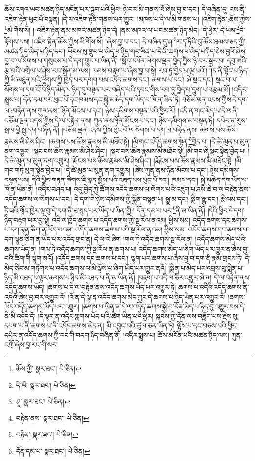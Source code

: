 ཆོས་འགའ་ཡང་མཚན་ཉིད་མངོན་པར་སྒྲུབ་པའི་ཕྱིར། ཉེ་བར་མི་གནས་སོ་ཞེས་བྱ་བ་དང་། དེ་བཞིན་དུ། ངས་ནི་འཇིག་རྟེན་ཕུང་པོ་བསྟན། །དེ་ལ་འཇིག་རྟེན་གནས་པར་གྱུར། །མཁས་པ་དེ་ལ་མི་གནས་པ། །འཇིག་རྟེན་:ཆོས་ཀྱིས་\footnote{ཆོས་ཀྱི་  སྣར་ཐང་།  པེ་ཅིན། }མི་གོས་སོ། །
འཇིག་རྟེན་ནམ་མཁའི་མཚན་ཉིད་དེ། །ནམ་མཁའ་ལ་ཡང་མཚན་ཉིད་མེད། །དེ་ཕྱིར་:དེ་ཡིས་\footnote{དེ་ཡི་  སྣར་ཐང་།  པེ་ཅིན། }དེ་རྟོགས་པས། །འཇིག་རྟེན་ཆོས་ཀྱིས་མི་གོས་སོ། །ཞེས་བྱ་བ་དང་། དེ་བཞིན་དུ་ཤ་\footnote{ཤཱ་  སྣར་ཐང་།  པེ་ཅིན། }ར་དྭ་ཏིའི་བུ་ཆོས་ཐམས་ཅད་ཀྱི་མཚན་ཉིད་མེད་པ་ཉིད་དང་། ཡོངས་སུ་གྲུབ་པ་མེད་པ་ཉིད་གང་ཡིན་པ་དེ་ནི་ཆགས་པ་མེད་པ་ཉིད་ཅེས་བྱའོ་ཞེས་བྱ་བ་ལ་སོགས་པ་གསུངས་པ་དེ་དག་གྲུབ་པ་ཡིན་ནོ། །སློབ་དཔོན་ལེགས་ལྡན་བྱེད་ཀྱིས་ཉེ་བར་སྦྱར་བ། དབུ་མའི་རྩ་བའི་འགྲེལ་པ་ཤེས་རབ་སྒྲོན་མ་ལས། ཁམས་བརྟག་པ་ཞེས་བྱ་བ་སྟེ། རབ་ཏུ་བྱེད་པ་ལྔ་པའོ།། །།ད་ནི་སྟོང་པ་ཉིད་ཀྱི་མི་མཐུན་པའི་ཕྱོགས་ཀྱི་ཁྱད་པར་དགག་པས་འདོད་ཆགས་དང་། ཆགས་པ་དང་། ཞེ་སྡང་དང་། སྡང་བ་ལ་སོགས་པ་དག་ངོ་བོ་ཉིད་མེད་པ་ཉིད་དུ་བསྟན་པར་བཞེད་པའི་དབང་གིས་རབ་ཏུ་བྱེད་པ་དྲུག་པ་བརྩམ་མོ། །འདིར་སྨྲས་པ། དོན་དམ་པར་ཕུང་པོ་དང་ཁམས་དང་སྐྱེ་མཆེད་དག་ཡོད་པ་ཁོ་ན་ཡིན་ཏེ། བཅོམ་ལྡན་འདས་ཀྱིས་དེ་དག་ལ་:བརྟེན་ནས་ཀུན་ནས་\footnote{བརྟེན་ནས་  སྣར་ཐང་།  པེ་ཅིན། }ཉོན་མོངས་པ་དང་། ཉེས་དམིགས་བསྟན་པའི་ཕྱིར་རོ། །འདི་ན་གང་མེད་པ་དེ་ལ་ནི་བཅོམ་ལྡན་འདས་ཀྱིས་དེ་ལ་བརྟེན་ནས། ཀུན་ནས་ཉོན་མོངས་པ་དང་། ཉེས་དམིགས་མ་བསྟན་ཏེ། དཔེར་ན་རུས་སྦལ་གྱི་སྤུ་དག་བཞིན་ནོ། །བཅོམ་ལྡན་འདས་ཀྱིས་ཕུང་པོ་ལ་སོགས་པ་དག་ལ་བརྟེན་ནས། ཆགས་པས་ཆོས་རྣམས་མི་ཤེས་ཤིང་། །ཆགས་པས་ཆོས་རྣམས་མི་མཐོང་སྟེ། །མི་གང་འདོད་ཆགས་སྟེན་\footnote{བརྟེན་  སྣར་ཐང་།  པེ་ཅིན། }བྱེད་པ། །དེ་ཚེ་མུན་པ་མུན་ནག་འགྱུར། །སྡང་བས་ཆོས་རྣམས་མི་ཤེས་ཤིང་། །སྡང་བས་ཆོས་རྣམས་མི་མཐོང་སྟེ། །མི་གང་ཞེ་སྡང་སྟེན་བྱེད་པ། །དེ་ཚེ་མུན་པ་མུན་ནག་འགྱུར། །རྨོངས་པས་ཆོས་རྣམས་མི་ཤེས་ཤིང་། །རྨོངས་པས་ཆོས་རྣམས་མི་མཐོང་སྟེ། །མི་གང་གཏི་མུག་སྟེན་བྱེད་པ། །དེ་ཚེ་མུན་པ་མུན་ནག་འགྱུར། །ཞེས་ཀུན་ནས་ཉོན་མོངས་པ་དང་། ཉེས་དམིགས་བསྟན་པས། དེའི་ཕྱིར་གཏན་ཚིགས་ཇི་སྐད་སྨོས་པའི་འཐད་པས་ཕུང་པོ་དང་། ཁམས་དང་། སྐྱེ་མཆེད་དག་ཡོད་པ་ཁོ་ན་ཡིན་ནོ། །འདིར་བཤད་པ། འདུ་བྱེད་ཀྱི་ཚོགས་འདོད་ཆགས་ལ་སོགས་པའི་འཇུག་པ་ཤས་ཆེ་བ་ལ་བརྟེན་ནས་འདོད་ཆགས་ལ་སོགས་པ་དང་། དེ་དག་གི་ཉེས་དམིགས་ཀྱི་སྐྱོན་བསྟན་པ། སྒྱུ་མ་དང་། སྨིག་རྒྱུ་དང་། རྨི་ལམ་དང་། དྲི་ཟའི་གྲོང་ཁྱེར་ལྟ་བུ་དེ་དག་ནི་ཐ་སྙད་པར་ཡོད་པ་ཡིན་གྱི:། དོན་དམ་པ་པར་\footnote{དོན་དམ་པ་  སྣར་ཐང་།  པེ་ཅིན། }ནི་མ་ཡིན་ནོ། །དེའི་ཕྱིར་དེ་དག་ཉིད་བརྟག་པར་བྱ་སྟེ། འདི་ལ་ཁྱོད་ཆགས་པ་འདོད་ཆགས་ཀྱི་སྔ་རོལ་ནའམ། ཕྱིས་སམ། འདོད་ཆགས་དང་ཆགས་པ་དག་ལྷན་ཅིག་ན་ཡོད་པའམ། འདོད་ཆགས་ཆགས་པའི་སྔ་རོལ་ནའམ། ཕྱིས་སམ། འདོད་ཆགས་དང་ཆགས་པ་དག་ལྷན་ཅིག་ན་ཡོད་པར་འདོད་གྲང་ན། དེ་ལ་རེ་ཞིག །གལ་ཏེ་འདོད་ཆགས་སྔ་རོལ་ན། །འདོད་ཆགས་མེད་པའི་ཆགས་ཡོད་ན། །གལ་ཏེ་འདོད་ཆགས་ཀྱི་སྔ་རོལ་ན་ཆགས་པ། འདོད་ཆགས་མེད་པ་ཞིག་ཡོད་པར་གྱུར་ན་ཞེས་བྱ་བའི་ཚིག་གི་ལྷག་མའོ། །འདོད་ཆགས་དང་ཆགས་པ་དང་། ལྷག་པར་ཆགས་པ་ཞེས་བྱ་བ་དག་ནི་རྣམ་གྲངས་ཏེ། དེ་མེད་ཅིང་མ་གཏོགས་པ་འདོད་ཆགས་ལ་མི་ལྟོས་པ་ཞིག་ཡོད་པར་གྱུར་ནའོ། །སྨིན་པ་མེད་པར་འབྲས་བུ་སྨིན་པ་ཉིད་མི་འཐད་པ་ལྟར་ཆགས་པ་ཉིད་མི་འཐད་པ་ནི་མ་ཡིན་ནོ། །བརྟག་པ་འདི་ལ་ཅིར་འགྱུར་ཞེ་ན། དེ་ལ་བརྟེན་ནས་འདོད་ཆགས་ཡོད། །ཆགས་པ་དེ་ལ་བརྟེན་ནས་འདོད་ཆགས་ཡོད་པར་འགྱུར་ཏེ། ཆགས་པ་འདིའི་འདོད་ཆགས་ནི་འདིའོ་ཞེས་བྱ་བར་འགྱུར་རོ། །འོ་ན་དེ་ལྟ་ན་འདོད་ཆགས་མེད་ཀྱང་དེ་ཆགས་པ་ཉིད་ཡིན་པར་འགྱུར་རོ། །ཆགས་ཡོད་འདོད་ཆགས་ཡོད་པར་འགྱུར། །ཆགས་པ་ཡིན་ན་དེ་ལ་འདོད་ཆགས་སྐྱེ་བ་དོན་མེད་པ་ཉིད་དུ་འགྱུར་བས་དེ་ནི་མི་འདོད་དོ། །དེ་ལྟར་ན་འདིར་གླགས་ཡོད་པའི་ཚིག་ཡིན་པའི་ཕྱིར། སྐབས་ཀྱི་དོན་ལས་བཟློག་པས་རྗེས་སུ་དཔག་པ་ནི་ཆགས་པ་ནི་འདོད་ཆགས་མེད་ན། མི་འབྱུང་བའི་ཚུལ་ཅན་ཡིན་ཏེ། ལྟོས་པ་དང་བཅས་པའི་ཕྱིར་དཔེར་ན་འདོད་ཆགས་ཀྱི་རང་གི་བདག་ཉིད་བཞིན་ནོ། །འདིར་སྨྲས་པ། ཆོས་མངོན་པའི་མཚན་ཉིད་ལས། ཀུན་འགྲོ་ཞེས་བྱ་རང་གི་སར། 